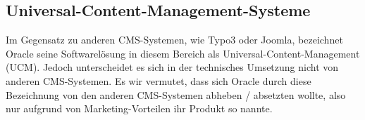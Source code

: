 \subsection{Universal-Content-Management-Systeme}
Im Gegensatz zu anderen \gls{CMS}-Systemen, wie Typo3 oder Joomla, bezeichnet Oracle seine Softwarelösung in diesem Bereich als Universal-Content-Management (\gls{UCM}).
Jedoch unterscheidet es sich in der technisches Umsetzung nicht von anderen \gls{CMS}-Systemen.
Es wir vermutet, dass sich Oracle durch diese Bezeichnung von den anderen \gls{CMS}-Systemen abheben / absetzten wollte, also nur aufgrund von Marketing-Vorteilen ihr Produkt so nannte.





















